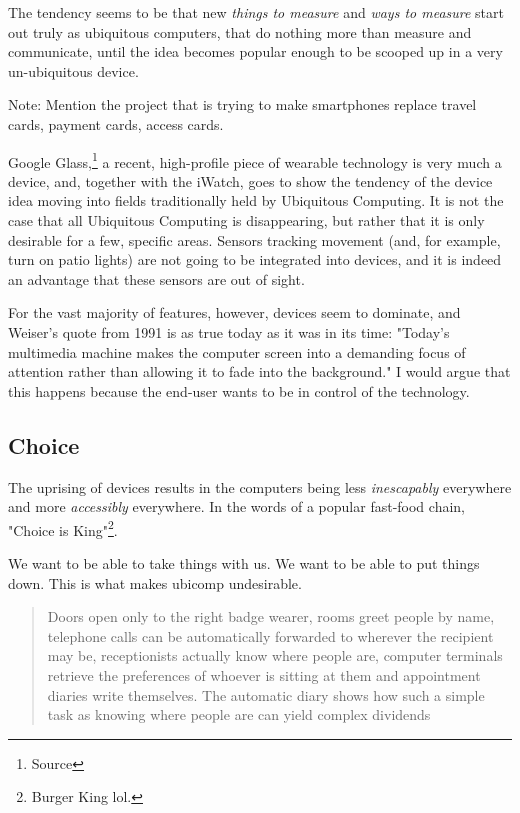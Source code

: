 The tendency seems to be that new \emph{things to measure} and \emph{ways to measure} start out truly as ubiquitous computers, that do
nothing more than measure and communicate, until the idea becomes popular enough to be scooped up in a very un-ubiquitous device.

Note: Mention the project that is trying to make smartphones replace travel cards, payment cards, access cards.

Google Glass,\footnote{Source} a recent, high-profile piece of wearable technology is very much a device, and, together with the iWatch,
goes to show the tendency of the device idea moving into fields traditionally held by Ubiquitous Computing. It is not the case that all
Ubiquitous Computing is disappearing, but rather that it is only desirable for a few, specific areas. Sensors tracking movement (and, for
example, turn on patio lights) are not going to be integrated into devices, and it is indeed an advantage that these sensors are out of sight.

For the vast majority of features, however, devices seem to dominate, and Weiser's quote from 1991 is as true today as it was in its
time: "Today's multimedia machine makes the computer screen into a demanding focus of attention rather than allowing it to fade into the
background."\cite{weiser91} I would argue that this happens because the end-user wants to be in control of the technology.

\subsection{Choice}

The uprising of devices results in the computers being less \emph{inescapably} everywhere and more \emph{accessibly} everywhere. In the words
of a popular fast-food chain, "Choice is King"\footnote{Burger King lol.}.

We want to be able to take things with us. We want to be able to put things down. This is what makes ubicomp undesirable.

\begin{quote}
    Doors open only to the right badge wearer, rooms greet people by name, telephone calls can be automatically forwarded to wherever the recipient may be, receptionists actually know where people are, computer terminals retrieve the preferences of whoever is sitting at them and appointment diaries write themselves. The automatic diary shows how such a simple task as knowing where people are can yield complex dividends\cite{weiser91}
\end{quote}

